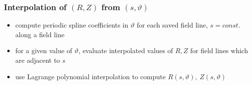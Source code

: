 \documentclass{beamer}
\begin{document}
\begin{frame}
\frametitle{Interpolation of $(R,Z)$ from $(s,\vartheta)$}
\vspace{0 cm}
		\vspace{0 cm}
		\begin{center}
			\begin{itemize}
				\item compute periodic spline coefficients in $\vartheta$ for each saved field line, $s=const.$ along a field line
				\item for a given value of $\vartheta$, evaluate interpolated values of $R,Z$ for field lines which are adjacent to $s$
				\item use Lagrange polynomial interpolation to compute $R(s,\vartheta),~ Z(s,\vartheta)$ 
			\end{itemize}
		\end{center}
\end{frame}
\end{document}
